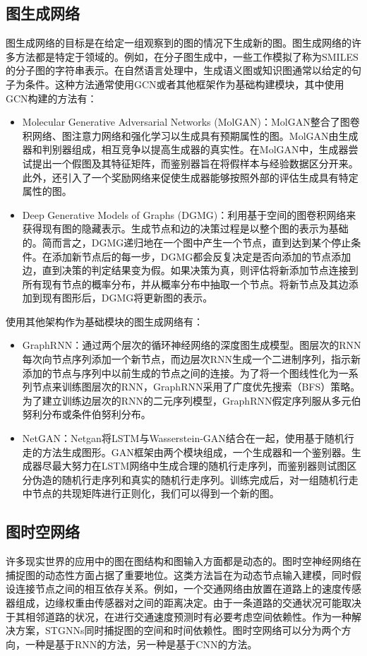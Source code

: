 \subsection{图生成网络}
图生成网络的目标是在给定一组观察到的图的情况下生成新的图。图生成网络的许多方法都是特定于领域的。例如，在分子图生成中，一些工作模拟了称为SMILES的分子图的字符串表示。在自然语言处理中，生成语义图或知识图通常以给定的句子为条件。这种方法通常使用GCN或者其他框架作为基础构建模块，其中使用GCN构建的方法有：
\begin{itemize}
    \item Molecular Generative Adversarial Networks (MolGAN)\cite{de2018molgan}：MolGAN整合了图卷积网络、图注意力网络和强化学习以生成具有预期属性的图。MolGAN由生成器和判别器组成，相互竞争以提高生成器的真实性。在MolGAN中，生成器尝试提出一个假图及其特征矩阵，而鉴别器旨在将假样本与经验数据区分开来。此外，还引入了一个奖励网络来促使生成器能够按照外部的评估生成具有特定属性的图。
    \item Deep Generative Models of Graphs (DGMG)\cite{li2018learning}：利用基于空间的图卷积网络来获得现有图的隐藏表示。生成节点和边的决策过程是以整个图的表示为基础的。简而言之，DGMG递归地在一个图中产生一个节点，直到达到某个停止条件。在添加新节点后的每一步，DGMG都会反复决定是否向添加的节点添加边，直到决策的判定结果变为假。如果决策为真，则评估将新添加节点连接到所有现有节点的概率分布，并从概率分布中抽取一个节点。将新节点及其边添加到现有图形后，DGMG将更新图的表示。
\end{itemize}
使用其他架构作为基础模块的图生成网络有：
\begin{itemize}
    \item GraphRNN\cite{2018GraphRNN}：通过两个层次的循环神经网络的深度图生成模型。图层次的RNN每次向节点序列添加一个新节点，而边层次RNN生成一个二进制序列，指示新添加的节点与序列中以前生成的节点之间的连接。为了将一个图线性化为一系列节点来训练图层次的RNN，GraphRNN采用了广度优先搜索（BFS）策略。为了建立训练边层次的RNN的二元序列模型，GraphRNN假定序列服从多元伯努利分布或条件伯努利分布。
    \item NetGAN\cite{2018NetGAN}：Netgan将LSTM与Wasserstein-GAN结合在一起，使用基于随机行走的方法生成图形。GAN框架由两个模块组成，一个生成器和一个鉴别器。生成器尽最大努力在LSTM网络中生成合理的随机行走序列，而鉴别器则试图区分伪造的随机行走序列和真实的随机行走序列。训练完成后，对一组随机行走中节点的共现矩阵进行正则化，我们可以得到一个新的图。
\end{itemize}

\subsection{图时空网络}
许多现实世界的应用中的图在图结构和图输入方面都是动态的。图时空神经网络在捕捉图的动态性方面占据了重要地位。这类方法旨在为动态节点输入建模，同时假设连接节点之间的相互依存关系。例如，一个交通网络由放置在道路上的速度传感器组成，边缘权重由传感器对之间的距离决定。由于一条道路的交通状况可能取决于其相邻道路的状况，在进行交通速度预测时有必要考虑空间依赖性。作为一种解决方案，STGNNs同时捕捉图的空间和时间依赖性。图时空网络可以分为两个方向，一种是基于RNN的方法，另一种是基于CNN的方法。


